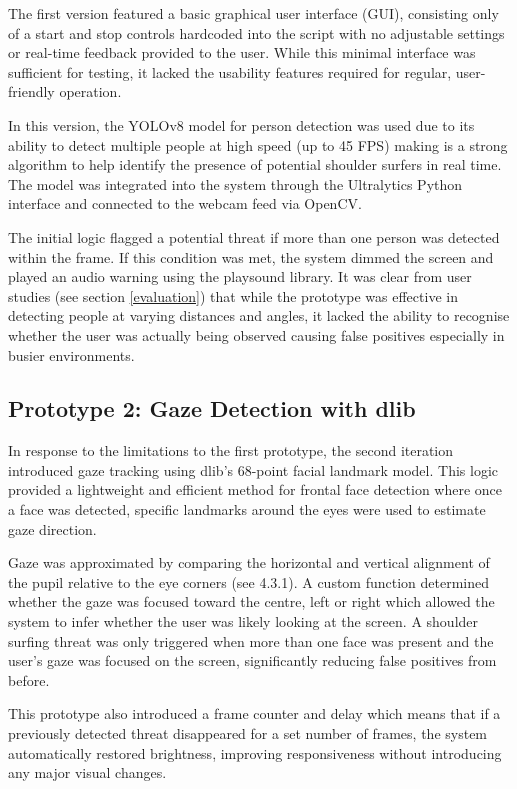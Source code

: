 \documentclass[12pt]{article}
\theoremstyle{plain}
\theoremstyle{definition}
\begin{document}
The first version featured a basic graphical user interface (GUI), consisting only of a start and stop controls hardcoded into the script with no adjustable settings or real-time feedback provided to the user. While this minimal interface was sufficient for testing, it lacked the usability features required for regular, user-friendly operation.

In this version, the YOLOv8 model for person detection was used due to its ability to detect multiple people at high speed (up to 45 FPS) making is a strong algorithm to help identify the presence of potential shoulder surfers in real time. The model was integrated into the system through the Ultralytics Python interface \cite{kukartsev_deep_2024} and connected to the webcam feed via OpenCV.

The initial logic flagged a potential threat if more than one person was detected within the frame. If this condition was met, the system dimmed the screen and played an audio warning using the playsound library. It was clear from user studies (see section \ref{evaluation}) that while the prototype was effective in detecting people at varying distances and angles, it lacked the ability to recognise whether the user was actually being observed causing false positives especially in busier environments.

\subsection{Prototype 2: Gaze Detection with dlib}
\label{prototype_2}

In response to the limitations to the first prototype, the second iteration introduced gaze tracking using dlib’s 68-point facial landmark model. This logic provided a lightweight and efficient method for frontal face detection where once a face was detected, specific landmarks around the eyes were used to estimate gaze direction.

Gaze was approximated by comparing the horizontal and vertical alignment of the pupil relative to the eye corners (see 4.3.1). A custom function determined whether the gaze was focused toward the centre, left or right which allowed the system to infer whether the user was likely looking at the screen. A shoulder surfing threat was only triggered when more than one face was present and the user’s gaze was focused on the screen, significantly reducing false positives from before.

This prototype also introduced a frame counter and delay which means that if a previously detected threat disappeared for a set number of frames, the system automatically restored brightness, improving responsiveness without introducing any major visual changes.
\end{document}
